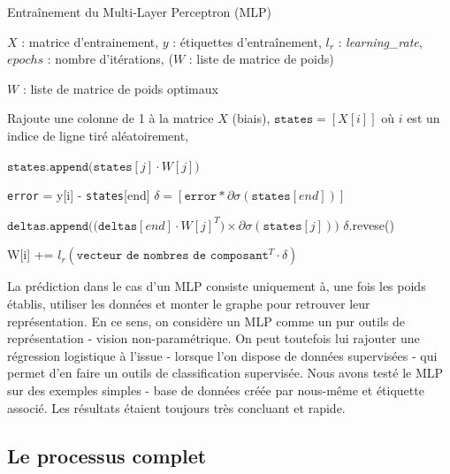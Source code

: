 \documentclass[10pt,a4paper]{article}
\begin{document}
\begin{algorithm}[ht!]
\caption{Entraînement du Multi-Layer Perceptron (MLP)}
\label{algoVince}
\begin{algorithmic}
\Require $X$ : matrice d'entrainement, $y$ : étiquettes d'entraînement, $l_r$ : \emph{learning\_rate}, $epochs$ : nombre d'itérations, ($W$ : liste de matrice de poids)

\Ensure $W$ : liste de matrice de poids optimaux

\State Rajoute une colonne de 1 à la matrice $X$ (biais),
	\State $\texttt{states} = [X[i]]$ où $i$ est un indice de ligne tiré aléatoirement,
	
		\State $\texttt{states.append(states}[j]\cdot W[j])$
	\EndFor
	
	\State \texttt{error} = y[i] - \texttt{states}[end]
	\State $\delta = [\texttt{error}*\partial\sigma(\texttt{states}[end])]$
		
		\State $\texttt{deltas.append((deltas}[end]\cdot W[j]^T) \times \partial \sigma(\texttt{states}[j]))$
	\EndFor
	\State $\delta .$revese()
	
		\State W[i] += $l_r(\texttt{vecteur de nombres de composant}^T\cdot \delta)$
	\EndFor
\EndFor
\end{algorithmic}
\end{algorithm}

La prédiction dans le cas d'un MLP consiste uniquement à, une fois les poids établis, utiliser les données et monter le graphe pour retrouver leur représentation. En ce sens, on considère un MLP comme un pur outils de représentation - vision non-paramétrique. On peut toutefois lui rajouter une régression logistique à l'issue - lorsque l'on dispose de données supervisées - qui permet d'en faire un outils de classification supervisée. Nous avons testé le MLP sur des exemples simples - base de données créée par nous-même et étiquette associé. Les résultats étaient toujours très concluant et rapide. 





\subsection{Le processus complet}
\end{document}
